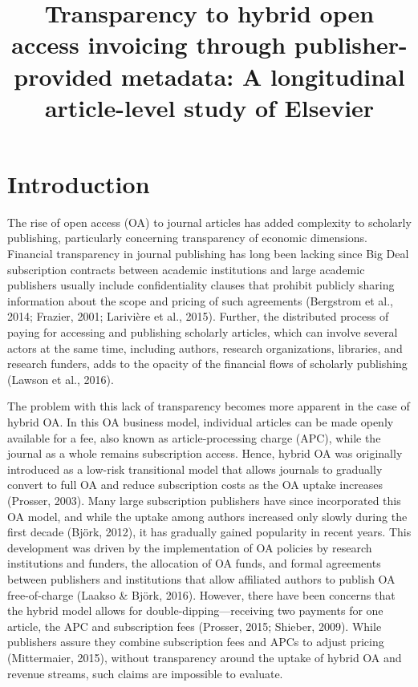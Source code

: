 \documentclass[a4paper,man,floatsintext,longtable,noextraspace,12pt]{apa6}
\title{Transparency to hybrid open access invoicing through publisher-provided metadata: A longitudinal article-level study of Elsevier}
\begin{document}
\maketitle

\hypertarget{introduction}{%
\section{Introduction}\label{introduction}}

The rise of open access (OA) to journal articles has added complexity to
scholarly publishing, particularly concerning transparency of economic
dimensions. Financial transparency in journal publishing has long been
lacking since Big Deal subscription contracts between academic
institutions and large academic publishers usually include
confidentiality clauses that prohibit publicly sharing information about
the scope and pricing of such agreements (Bergstrom et al., 2014;
Frazier, 2001; Larivière et al., 2015). Further, the distributed process
of paying for accessing and publishing scholarly articles, which can
involve several actors at the same time, including authors, research
organizations, libraries, and research funders, adds to the opacity of
the financial flows of scholarly publishing (Lawson et al., 2016).

The problem with this lack of transparency becomes more apparent in the
case of hybrid OA. In this OA business model, individual articles can be
made openly available for a fee, also known as article-processing charge
(APC), while the journal as a whole remains subscription access. Hence,
hybrid OA was originally introduced as a low-risk transitional model
that allows journals to gradually convert to full OA and reduce
subscription costs as the OA uptake increases (Prosser, 2003). Many
large subscription publishers have since incorporated this OA model, and
while the uptake among authors increased only slowly during the first
decade (Björk, 2012), it has gradually gained popularity in recent
years. This development was driven by the implementation of OA policies
by research institutions and funders, the allocation of OA funds, and
formal agreements between publishers and institutions that allow
affiliated authors to publish OA free-of-charge (Laakso \& Björk, 2016).
However, there have been concerns that the hybrid model allows for
double-dipping---receiving two payments for one article, the APC and
subscription fees (Prosser, 2015; Shieber, 2009). While publishers
assure they combine subscription fees and APCs to adjust pricing
(Mittermaier, 2015), without transparency around the uptake of hybrid OA
and revenue streams, such claims are impossible to evaluate.
\end{document}
